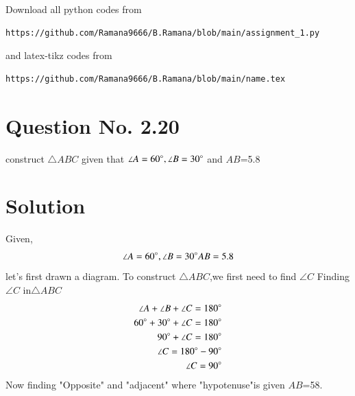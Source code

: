 \documentclass[journal,12pt,twocolumn]{IEEEtran}
\begin{document}
\maketitle
\newpage
\bigskip
\renewcommand{\thefigure}{\theenumi}
\renewcommand{\thetable}{\theenumi}
\newcommand*{\permcomb}[4][0mu]{{{}^{#3}\mkern#1#2_{#4}}}
\newcommand*{\perm}[1][-3mu]{\permcomb[#1]{P}}
\newcommand*{\comb}[1][-1mu]{\permcomb[#1]{C}}
Download all python codes from 
\begin{lstlisting}
https://github.com/Ramana9666/B.Ramana/blob/main/assignment_1.py
\end{lstlisting}
%
and latex-tikz codes from 
%
\begin{lstlisting}
https://github.com/Ramana9666/B.Ramana/blob/main/name.tex
\end{lstlisting}
\section*{Question No. 2.20}
construct $\triangle ABC$ given that $\angle A=60\degree,\angle B=30\degree$ and $AB$=5.8
\section*{Solution}
Given,
\begin{align}
\angle A=60\degree,\angle B=30\degree AB=5.8
\end{align}
let's first drawn a diagram.
To construct $\triangle ABC$,we first need to find $\angle C$
Finding $\angle C$ in$\triangle ABC$
\begin{align}
\angle A+\angle B+\angle C=180\degree\\
60\degree+30\degree+\angle C = 180\degree\\
90\degree+\angle C=180\degree\\
\angle C=180\degree-90\degree\\
\angle C=90\degree    
\end{align}
Now finding "Opposite" and "adjacent" where "hypotenuse"is given $AB$=58.
\end{document}
